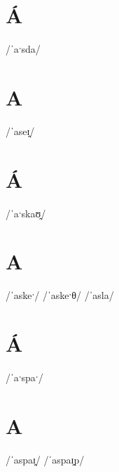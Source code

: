 \documentclass[10pt,a4paper,twoside]{book}
\begin{document}
\section*{Á}

\begin{multicols}{3}
 {/ˈaˑsda/} {}
\end{multicols}

\section*{A}

\begin{multicols}{3}
 {/ˈaseɪ̯/} {}
\end{multicols}

\section*{Á}

\begin{multicols}{3}
 {/ˈaˑskaʊ̯/} {}
\end{multicols}

\section*{A}

\begin{multicols}{3}
 {/ˈaskeˑ/} {}
 {/ˈaskeˑθ/} {}
 {/ˈasla/} {}
\end{multicols}

\section*{Á}

\begin{multicols}{3}
 {/ˈaˑspaˑ/} {}
\end{multicols}

\section*{A}

\begin{multicols}{3}
 {/ˈaspaɪ̯/} {}
 {/ˈaspaɪ̯p/} {}
\end{multicols}
\end{document}
